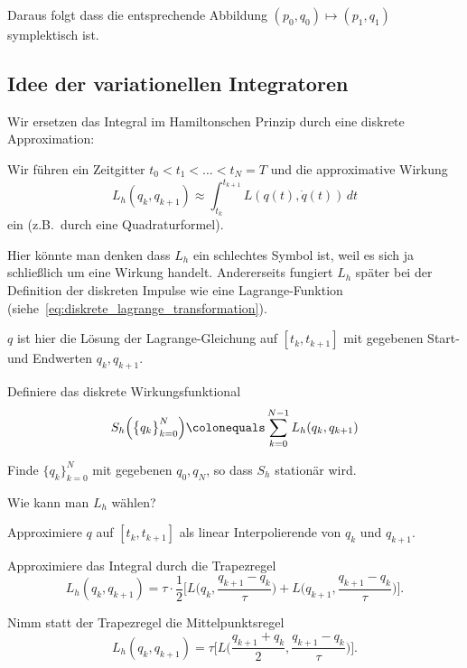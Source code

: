 Daraus folgt dass die entsprechende Abbildung $(p_0,q_0) \mapsto (p_1,q_1)$ symplektisch ist.

\subsection{Idee der variationellen Integratoren}

Wir ersetzen das Integral im Hamiltonschen Prinzip durch eine diskrete Approximation:

Wir führen ein Zeitgitter $t_0<t_1<\hdots < t_N = T$ und die approximative Wirkung
\begin{equation*}
	L_h(q_k,q_{k+1})\approx \int_{t_k}^{t_{k+1}} L(q(t),\dot q(t))\,dt
\end{equation*}
ein (z.B.\ durch eine Quadraturformel).

Hier könnte man denken dass $L_h$ ein schlechtes Symbol ist, weil es sich ja schließlich um eine Wirkung handelt. Andererseits fungiert $L_h$ später bei der Definition der diskreten Impulse wie eine Lagrange-Funktion (siehe~\eqref{eq:diskrete_lagrange_transformation}).

$q$ ist hier die Lösung der Lagrange-Gleichung auf $[t_k,t_{k+1}]$ mit gegebenen Start- und Endwerten $q_k,q_{k+1}$.
	
Definiere das diskrete Wirkungsfunktional
\begin{equation*}
	S_h\Big(\big\{q_k\big\}_{k=0}^N\Big) \colonequals \sum_{k=0}^{N-1} L_h(q_k,q_{k+1})
\end{equation*}

\begin{definition}
	Finde $\{q_k\}^N_{k=0}$  mit gegebenen $q_0, q_N$, so dass $S_h$ stationär wird.
\end{definition}

Wie kann man $L_h$ wählen?

\begin{bsp}
	Approximiere $q$ auf $[t_k, t_{k+1}]$ als linear Interpolierende von $q_k$ und $q_{k+1}$.
	
	Approximiere das Integral durch die Trapezregel
	\begin{equation*}
		L_h(q_k, q_{k+1}) =
		\tau \cdot \frac{1}{2} \Big[L\Big(q_k, \frac{q_{k+1} - q_k}{\tau}\Big) +  L\Big(q_{k+1}, \frac{q_{k+1} - q_k}{\tau}\Big)\Big].
	\end{equation*}
\end{bsp}

\begin{bsp}
	Nimm statt der Trapezregel die Mittelpunktsregel
	\begin{equation*}
		L_h(q_k, q_{k+1}) = \tau \Big[L\Big(\frac{q_{k+1} + q_k}{2}, \frac{q_{k+1} - q_k}{\tau}\Big)\Big].
	\end{equation*}
\end{bsp}


